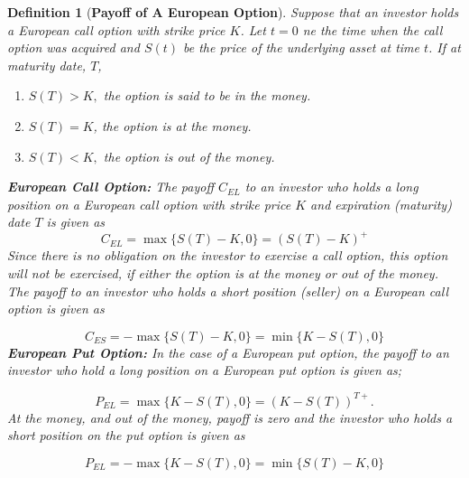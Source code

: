 \documentclass[a4 paper, 12pt]{report}
\theoremstyle{plain}
\newtheorem{definition}[theorem]{\textbf{Definition}}
\begin{document}
\begin{definition}[\textbf{Payoff of A European Option}]\label{1.2.6a}
\normalfont
Suppose that an investor holds a European call option with strike price $K$. Let $t = 0$ ne the time when the call option was acquired and $S(t)$ be the price of the underlying asset at time $t$. If at maturity date, $T$,
\begin{enumerate}
\item[(i)] $S(T) > K,$ the option is said to be in the money.
\item[(ii)] $S(T) = K$, the option is at the money.
\item[(iii)] $S(T) < K,$ the option is out of the money.
\end{enumerate}
\textbf{European Call Option:} The payoff $C_{EL}$ to an investor who holds a long position on a European call option with strike price $K$ and expiration (maturity) date $T$ is given as
\begin{equation}\label{1.2.1}
C_{EL} = \max\{S(T)-K,0\} = (S(T)-K)^+
\end{equation}
Since there is no obligation on the investor to exercise a call option, this option will not be exercised, if either the option is at the money or out of the money. The payoff to an investor who holds a short position (seller) on a European call option is given as

\begin{equation}\label{1.2.2}
C_{ES} = -\max\{S(T) - K,0\} =  \min\{K - S(T),0\}
\end{equation}
\textbf{European Put Option:} In the case of a European put option, the payoff to an investor who hold a long position on a European put option is given as;


\begin{equation}\label{1.2.3}
P_{EL} = \max\{K-S(T),0\} = (K-S(T))^{T+}.
\end{equation}
At the money, and out of the money, payoff is zero and the investor who holds a short position on the put option is given as

\begin{equation}\label{1.2.4}
P_{EL} = -\max\{K - S(T),0\} = \min\{S(T)-K,0\}
\end{equation}
%
%
%
%
%
%

\end{definition}
\end{document}
